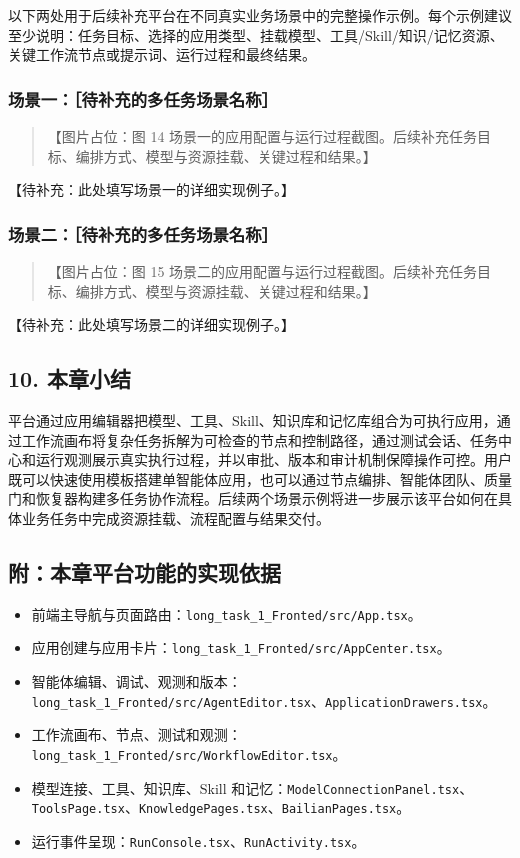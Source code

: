 \documentclass[UTF8,a4paper,12pt]{ctexart}
\providecommand{\tightlist}{%
  \setlength{\itemsep}{0pt}\setlength{\parskip}{0pt}}
\begin{document}
以下两处用于后续补充平台在不同真实业务场景中的完整操作示例。每个示例建议至少说明：任务目标、选择的应用类型、挂载模型、工具/Skill/知识/记忆资源、关键工作流节点或提示词、运行过程和最终结果。

\subsubsection{场景一：［待补充的多任务场景名称］}

\begin{quote}
【图片占位：图 14 场景一的应用配置与运行过程截图。后续补充任务目标、编排方式、模型与资源挂载、关键过程和结果。】
\end{quote}

【待补充：此处填写场景一的详细实现例子。】

\subsubsection{场景二：［待补充的多任务场景名称］}

\begin{quote}
【图片占位：图 15 场景二的应用配置与运行过程截图。后续补充任务目标、编排方式、模型与资源挂载、关键过程和结果。】
\end{quote}

【待补充：此处填写场景二的详细实现例子。】

\subsection{10. 本章小结}

平台通过应用编辑器把模型、工具、Skill、知识库和记忆库组合为可执行应用，通过工作流画布将复杂任务拆解为可检查的节点和控制路径，通过测试会话、任务中心和运行观测展示真实执行过程，并以审批、版本和审计机制保障操作可控。用户既可以快速使用模板搭建单智能体应用，也可以通过节点编排、智能体团队、质量门和恢复器构建多任务协作流程。后续两个场景示例将进一步展示该平台如何在具体业务任务中完成资源挂载、流程配置与结果交付。

\subsection{附：本章平台功能的实现依据}

\begin{itemize}
\tightlist
\item
  前端主导航与页面路由：\texttt{long\_task\_1\_Fronted/src/App.tsx}。
\item
  应用创建与应用卡片：\texttt{long\_task\_1\_Fronted/src/AppCenter.tsx}。
\item
  智能体编辑、调试、观测和版本：\texttt{long\_task\_1\_Fronted/src/AgentEditor.tsx}、\texttt{ApplicationDrawers.tsx}。
\item
  工作流画布、节点、测试和观测：\texttt{long\_task\_1\_Fronted/src/WorkflowEditor.tsx}。
\item
  模型连接、工具、知识库、Skill 和记忆：\texttt{ModelConnectionPanel.tsx}、\texttt{ToolsPage.tsx}、\texttt{KnowledgePages.tsx}、\texttt{BailianPages.tsx}。
\item
  运行事件呈现：\texttt{RunConsole.tsx}、\texttt{RunActivity.tsx}。
\end{itemize}
\end{document}
